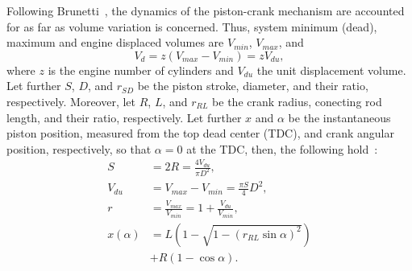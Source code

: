     Following Brunetti~\cite{2012-BrunettiF-Blucher}, the dynamics of the piston-crank mechanism are accounted  for  as  far  as
    volume variation is concerned. Thus, system minimum (dead), maximum and engine displaced volumes are  $V_{min}$,  $V_{max}$,
    and%
    \begin{equation}
        V_d = z(V_{max} - V_{min}) = zV_{du},
        \label{eq:Vd}
    \end{equation}
    \noindent where $z$ is the engine number of cylinders and $V_{du}$ the unit displacement volume. Let further $S$,  $D$,  and
    $r_{SD}$ be the piston stroke, diameter, and their ratio, respectively. Moreover, let $R$, $L$, and $r_{RL}$  be  the  crank
    radius, conecting rod length, and their ratio, respectively. Let further  $x$  and  $\alpha$  be  the  instantaneous  piston
    position, measured from the top dead center (TDC), and crank angular position, respectively, so that $\alpha  =  0$  at  the
    TDC, then, the following hold~\cite{2012-BrunettiF-Blucher, 2017-NaaktgeborenC-IntJMechEngEduc}:%
    \begin{align}
        \label{eq:S}
        S           &= 2R = \frac{4 V_{du}}{\pi D^{2}}, \\
        \label{eq:Vdu}
        V_{du}      &= V_{max} - V_{min} = \frac{\pi S}{4} D^{2}, \\
        \label{eq:r}
        r           &= \frac{V_{max}}{V_{min}} = 1 + \frac{V_{du}}{V_{min}}, \\
        \label{eq:x}
        x(\alpha)   &=
            L\left(
                1 - \sqrt{1 - (r_{RL}\sin\alpha)^2}
            \right) \nonumber\\
                    &+ R(1 - \cos\alpha).
    \end{align}



